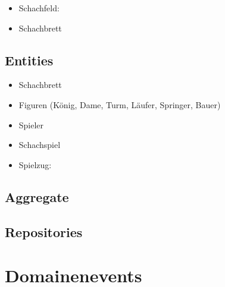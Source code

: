 \begin{itemize}
    \item Schachfeld: 
    \item Schachbrett    
\end{itemize}

\subsection*{Entities}

\begin{itemize}
    \item Schachbrett
    \item Figuren (König, Dame, Turm, Läufer, Springer, Bauer)
    \item Spieler 
    \item Schachspiel
    \item Spielzug:
\end{itemize}

\subsection*{Aggregate}

\subsection*{Repositories}

\section{Domainenevents}